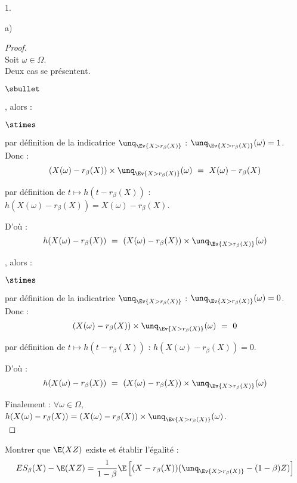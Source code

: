 \documentclass[11pt]{article}%
\begin{document}
\begin{noliste}{1.}
\begin{noliste}{a)}
    \begin{proof}~\\
      Soit $\omega \in \Omega$.\\
      Deux cas se présentent.
      \begin{noliste}{$\sbullet$}
	\item {}, alors :
	\begin{noliste}{$\stimes$}
	  \item par définition de la \var indicatrice $\unq_{\Ev{ X >
	  r_\beta(X)}}$ : $\unq_{\Ev{ X> r_\beta(X)}}(\omega) = 1$.\\
	  Donc :
	  \[
	    (X(\omega) - r_\beta(X)) \times \unq_{\Ev{ X > r_\beta(X)}}
	    (\omega) \ = \ X(\omega) - r_\beta(X)
	  \]
	  
	  \item par définition de $t \mapsto h(t- r_\beta(X))$ : 
	  $h(X(\omega) - r_\beta(X)) = X(\omega) - r_\beta(X)$.
	\end{noliste}
	D'où :
	\[
	  h(X(\omega) - r_\beta(X)) \ = \ (X(\omega) - r_\beta(X))
	  \times \unq_{\Ev{ X> r_\beta(X)}}(\omega)
	\]
	
	\item {}, alors :
	\begin{noliste}{$\stimes$}
	  \item par définition de la \var indicatrice $\unq_{\Ev{ X >
	  r_\beta(X)}}$ : $\unq_{\Ev{ X> r_\beta(X)}}(\omega) = 0$.\\
	  Donc :
	  \[
	    (X(\omega) - r_\beta(X)) \times \unq_{\Ev{ X > r_\beta(X)}}
	    (\omega) \ = \ 0
	  \]
	  
	  \item par définition de $t \mapsto h(t- r_\beta(X))$ : 
	  $h(X(\omega) - r_\beta(X)) = 0$.
	\end{noliste}
	
	
	\newpage
	
	
	D'où :
	\[
	  h(X(\omega) - r_\beta(X)) \ = \ (X(\omega) - r_\beta(X))
	  \times \unq_{\Ev{ X> r_\beta(X)}}(\omega)
	\]
      \end{noliste}
      Finalement : $\forall \omega \in \Omega$, $h(X(\omega) - 
      r_\beta(X)) = (X(\omega)- r_\beta(X)) \times \unq_{\Ev{X > 
      r_\beta(X)}}(\omega)$.
      ~\\[-1cm]
    \end{proof}

    
    \item Montrer que $\E(XZ)$ existe et établir l'égalité :
    \[
    ES_\beta(X) -\E(XZ) = \dfrac{1}{1-\beta} \E\left[(X-r_\beta(X))
      (\unq_{\Ev{X > r_\beta(X)}}-(1-\beta)Z)\right]
    \]
    

\end{noliste}
\end{noliste}
\end{document}

